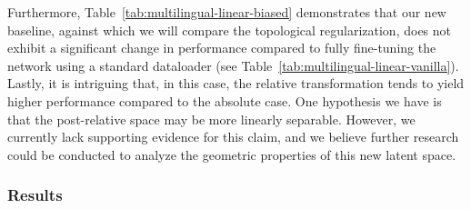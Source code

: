 \documentclass[../main.tex]{subfiles}
\begin{document}
\begin{table}[ht!]
\centering
{}
\caption{Linear biased dataloader (over two random seeds)}
\label{tab:multilingual-linear-biased}
\end{table}

Furthermore, Table~\ref{tab:multilingual-linear-biased} demonstrates that our new baseline, against which we will compare the topological regularization, does not exhibit a significant change in performance compared to fully fine-tuning the network using a standard dataloader (see Table~\ref{tab:multilingual-linear-vanilla}).\\

Lastly, it is intriguing that, in this case, the relative transformation tends to yield higher performance compared to the absolute case. One hypothesis we have is that the post-relative space may be more linearly separable. However, we currently lack supporting evidence for this claim, and we believe further research could be conducted to analyze the geometric properties of this new latent space.


\subsubsection*{Results}
\end{document}
